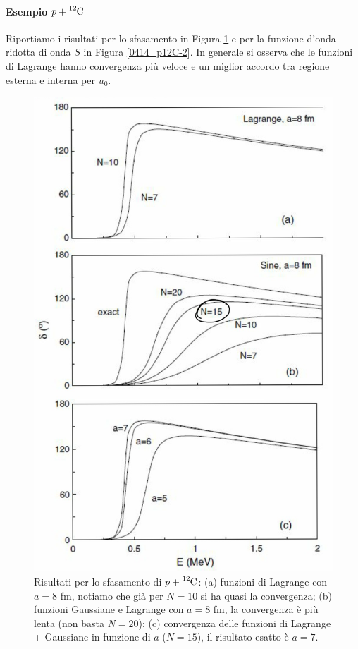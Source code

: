 \paragraph{Esempio ${p+\ce{^{12}C}}$} Riportiamo i risultati per lo sfasamento in Figura \ref{0414_p12C} e per la funzione d'onda ridotta di onda $S$ in Figura \ref{0414_p12C-2}. In generale si osserva che le funzioni di Lagrange hanno convergenza più veloce e un miglior accordo tra regione esterna e interna per $u_0$.
\begin{figure}[!h]
	\centering
	\includegraphics[scale=0.2]{Immagini/0414_metodi.png}
	\caption{Risultati per lo sfasamento di $p+\ce{^{12}C}$: (a) funzioni di Lagrange con $a=8$ fm, notiamo che già per $N=10$ si ha quasi la convergenza; (b) funzioni Gaussiane e Lagrange con $a=8$ fm, la convergenza è più lenta (non basta $N=20$); (c) convergenza delle funzioni di Lagrange + Gaussiane in funzione di $a$ ($N=15$), il risultato esatto è $a=7$.}
	\label{0414_p12C}
\end{figure}

